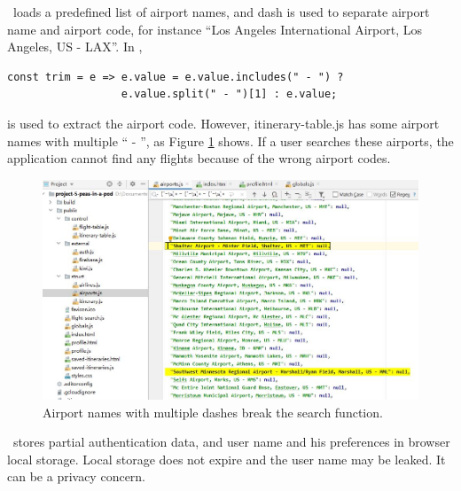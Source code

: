 \documentclass[12pt, a4paper]{article}
\newcommand{\code}[1]{\texttt{#1}}
\begin{document}



\theproject\ loads a predefined list of airport names, and dash is used to separate airport name and airport code, for instance ``Los Angeles International Airport, Los Angeles, US - LAX''. In , 
\begin{lstlisting}
const trim = e => e.value = e.value.includes(" - ") ?
                  e.value.split(" - ")[1] : e.value;
\end{lstlisting}
is used to extract the airport code. However, itinerary-table.js has some airport names with multiple `` - '', as Figure \ref{fig:airport} shows. If a user searches these airports, the application cannot find any flights because of the wrong airport codes.

\begin{figure}[ht]
\centering
\includegraphics[width=\textwidth]{airport-names.JPG}
\caption{Airport names with multiple dashes break the search function.}
\label{fig:airport}
\end{figure}


\theproject\ stores partial authentication data, and user name and his preferences in browser local storage. Local storage does not expire and the user name may be leaked. It can be a privacy concern.
\end{document}
